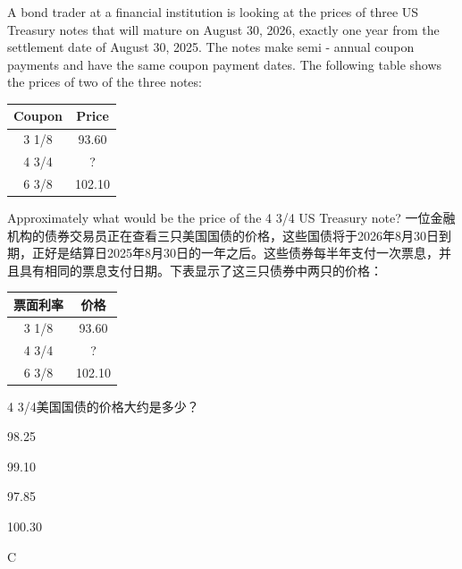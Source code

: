 \documentclass{article}
\newcounter{question} %
\begin{document}
\begin{question}
    A bond trader at a financial institution is looking at the prices of three US Treasury notes that will mature on August 30, 2026, exactly one year from the settlement date of August 30, 2025. The notes make semi - annual coupon payments and have the same coupon payment dates. The following table shows the prices of two of the three notes:
    \begin{center}
    \begin{tabular}{|c|c|}
    \hline
    Coupon & Price \\
    \hline
    3 1/8 & 93.60 \\
    4 3/4 &? \\
    6 3/8 & 102.10 \\
    \hline
    \end{tabular}
    \end{center}
    Approximately what would be the price of the 4 3/4 US Treasury note?
    一位金融机构的债券交易员正在查看三只美国国债的价格，这些国债将于2026年8月30日到期，正好是结算日2025年8月30日的一年之后。这些债券每半年支付一次票息，并且具有相同的票息支付日期。下表显示了这三只债券中两只的价格：
    \begin{center}
    \begin{tabular}{|c|c|}
    \hline
    票面利率 & 价格 \\
    \hline
    3 1/8 & 93.60 \\
    4 3/4 &? \\
    6 3/8 & 102.10 \\
    \hline
    \end{tabular}
    \end{center}
    4 3/4美国国债的价格大约是多少？
    \end{question}
    
    \begin{choices}
        \item 98.25
        \item 99.10
        \item 97.85
        \item 100.30
    \end{choices}
    
    \begin{correctanswer}
        C
    \end{correctanswer}
    
\end{document}
